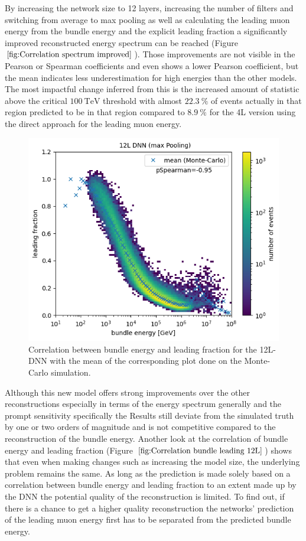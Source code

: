 \documentclass[
  tucolor,       %
  BCOR=12mm,     %
  parskip=half,  %
  open=any,      %
  cleardoublepage=plain,  %
]{tudothesis}
\begin{document}
By increasing the network size to 12 layers, increasing the number of filters and switching from average to max pooling as well as calculating the leading muon energy from the bundle energy and the explicit leading fraction a significantly improved reconstructed energy spectrum can be reached (Figure $\ref{fig:Correlation spectrum improved}$).
Those improvements are not visible in the Pearson or Spearman coefficients and even shows a lower Pearson coefficient, but the mean indicates less underestimation for high energies than the other models.
The most impactful change inferred from this is the increased amount of statistic above the critical $\SI{100}{\tera\electronvolt}$ threshold with almost $\SI{22.3}{\percent}$ of events actually in that region predicted to be in that region compared to $\SI{8.9}{\percent}$ for the 4L version using the direct approach for the leading muon energy.
\begin{figure}
  \centering
  \includegraphics[scale=0.6]{Plots/Correlation bundle leading 12L}
  \caption{Correlation between bundle energy and leading fraction for the 12L-DNN with the mean of the corresponding plot done on the Monte-Carlo simulation.}
  \label{fig:Correlation bundle leading 12L}
\end{figure}
Although this new model offers strong improvements over the other reconstructions especially in terms of the energy spectrum generally and the prompt sensitivity specifically the Results still deviate from the simulated truth by one or two orders of magnitude and is not competitive compared to the reconstruction of the bundle energy.
Another look at the correlation of bundle energy and leading fraction (Figure $\ref{fig:Correlation bundle leading 12L}$) shows that even when making changes such as increasing the model size, the underlying problem remains the same.
As long as the prediction is made solely based on a correlation between bundle energy and leading fraction to an extent made up by the DNN the potential quality of the reconstruction is limited.
To find out, if there is a chance to get a higher quality reconstruction the networks' prediction of the leading muon energy first has to be separated from the predicted bundle energy.
\end{document}
